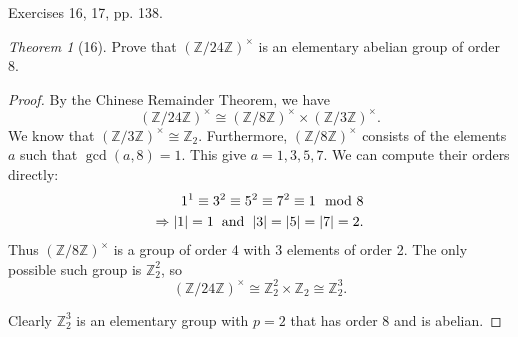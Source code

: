 \documentclass[12pt]{article}
\theoremstyle{remark}
\theoremstyle{named}
\newtheorem*{theorem}{Theorem}
\renewcommand{\implies}{\Rightarrow}
\begin{document}
Exercises 16, 17, pp. 138.

\begin{theorem}[16]
    Prove that \((\mathbb Z / 24 \mathbb Z)^\times\) is an elementary abelian group of order 8.
\end{theorem}

\begin{proof}
    By the Chinese Remainder Theorem, we have 
    \[(\mathbb Z / 24 \mathbb Z)^\times \cong (\mathbb Z / 8 \mathbb Z)^\times \times (\mathbb Z / 3 \mathbb Z)^\times.\]
    We know that \((\mathbb Z / 3 \mathbb Z)^\times \cong \mathbb Z_2\). Furthermore, \((\mathbb Z / 8 \mathbb Z)^\times\) consists of the elements \(a\) such that \(\gcd(a, 8) = 1\). This give \(a = 1, 3, 5, 7\). We can compute their orders directly:
    \begin{align*}
        1^1 \equiv 3^2 \equiv 5^2 \equiv 7^2 \equiv 1 \mod 8 \\
        \implies |1| = 1 \hspace{2mm} \text{and} \hspace{2mm} |3| = |5| = |7| = 2.
    \end{align*}
    Thus \((\mathbb Z / 8 \mathbb Z)^\times\) is a group of order 4 with 3 elements of order 2. The only possible such group is \(\mathbb Z_2^2\), so
    \[(\mathbb Z / 24 \mathbb Z)^\times \cong \mathbb Z_2^2 \times \mathbb Z_2 \cong \mathbb Z_2^3.\] 

    Clearly \(\mathbb Z_2^3\) is an elementary group with \(p = 2\) that has order 8 and is abelian.
\end{proof}
\end{document}
